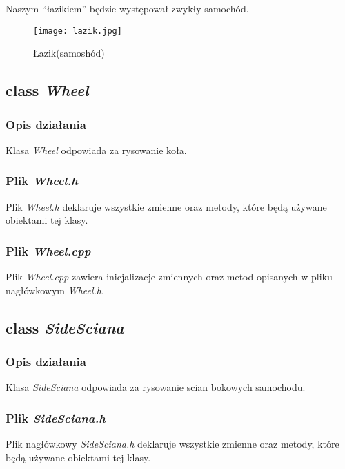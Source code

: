\documentclass[a4paper, 12pt]{report}
\begin{document}
Naszym ``łazikiem'' będzie występował zwykły samochód.

\begin{figure}[h]
		\centering
		\texttt{[image: lazik.jpg]}
		\caption{Łazik(samoshód)}
\end{figure}


\subsection{class \emph{Wheel}}
\subsubsection{Opis działania}

Klasa \emph{Wheel} odpowiada za rysowanie koła.

\subsubsection{Plik \emph{Wheel.h}}

Plik \emph{Wheel.h} deklaruje wszystkie zmienne oraz metody, które będą używane obiektami tej klasy.



\subsubsection{Plik \emph{Wheel.cpp}}

Plik \emph{Wheel.cpp} zawiera inicjalizacje zmiennych oraz metod opisanych w pliku nagłówkowym \emph{Wheel.h}.



\subsection{class \emph{SideSciana}}
\subsubsection{Opis działania}

Klasa \emph{SideSciana} odpowiada za rysowanie scian bokowych samochodu.

\subsubsection{Plik \emph{SideSciana.h}}

Plik nagłówkowy \emph{SideSciana.h} deklaruje wszystkie zmienne oraz metody, które będą używane obiektami tej klasy.
\end{document}
